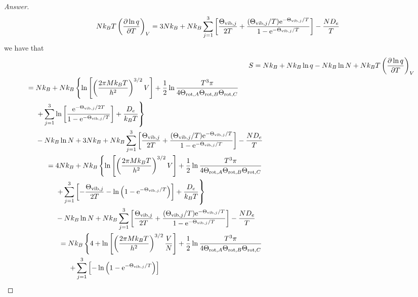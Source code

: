 \documentclass[../psets.tex]{subfiles}
\begin{document}
\begin{enumerate}
\begin{proof}[Answer]
\begin{align*}
            Nk_BT\left( \pdv{\ln q}{T} \right)_V &= 3Nk_B+Nk_B\sum_{j=1}^3\left[ \frac{\Theta_{\text{vib},j}}{2T}+\frac{(\Theta_{\text{vib},j}/T)\e[-\Theta_{\text{vib},j}/T]}{1-\e[-\Theta_{\text{vib},j}/T]} \right]-\frac{ND_e}{T}
        \end{align*}
        we have that
        \begin{align*}
            S ={}& Nk_B+Nk_B\ln q-Nk_B\ln N+Nk_BT\left( \pdv{\ln q}{T} \right)_V\\
            \begin{split}
                ={}& Nk_B+Nk_B\left\{ \ln\left[ \left( \frac{2\pi Mk_BT}{h^2} \right)^{3/2}V \right]+\frac{1}{2}\ln\frac{T^3\pi}{4\Theta_{\text{rot},A}\Theta_{\text{rot},B}\Theta_{\text{rot},C}}\right.\\
                & \left. +\sum_{j=1}^3\ln\left[ \frac{\e[-\Theta_{\text{vib},j}/2T]}{1-\e[-\Theta_{\text{vib},j}/T]} \right]+\frac{D_e}{k_BT} \right\}\\
                & -Nk_B\ln N+3Nk_B+Nk_B\sum_{j=1}^3\left[ \frac{\Theta_{\text{vib},j}}{2T}+\frac{(\Theta_{\text{vib},j}/T)\e[-\Theta_{\text{vib},j}/T]}{1-\e[-\Theta_{\text{vib},j}/T]} \right]-\frac{ND_e}{T}
            \end{split}\\
            \begin{split}
                ={}& 4Nk_B+Nk_B\left\{ \ln\left[ \left( \frac{2\pi Mk_BT}{h^2} \right)^{3/2}V \right]+\frac{1}{2}\ln\frac{T^3\pi}{4\Theta_{\text{rot},A}\Theta_{\text{rot},B}\Theta_{\text{rot},C}} \right.\\
                & \left. +\sum_{j=1}^3\left[ -\frac{\Theta_{\text{vib},j}}{2T}-\ln\left( 1-\e[-\Theta_{\text{vib},j}/T] \right) \right]+\frac{D_e}{k_BT} \right\}\\
                & -Nk_B\ln N+Nk_B\sum_{j=1}^3\left[ \frac{\Theta_{\text{vib},j}}{2T}+\frac{(\Theta_{\text{vib},j}/T)\e[-\Theta_{\text{vib},j}/T]}{1-\e[-\Theta_{\text{vib},j}/T]} \right]-\frac{ND_e}{T}
            \end{split}\\
            \begin{split}
                ={}& Nk_B\left\{ 4+\ln\left[ \left( \frac{2\pi Mk_BT}{h^2} \right)^{3/2}\frac{V}{N} \right]+\frac{1}{2}\ln\frac{T^3\pi}{4\Theta_{\text{rot},A}\Theta_{\text{rot},B}\Theta_{\text{rot},C}} \right.\\
                & \left. +\sum_{j=1}^3\left[ -\ln\left( 1-\e[-\Theta_{\text{vib},j}/T] \right) \right] \right.\\

\end{split}
\end{align*}
\end{proof}
\end{enumerate}
\end{document}
